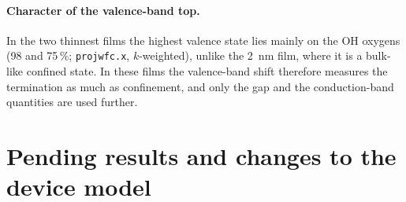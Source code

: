 \paragraph{Character of the valence-band top.} In the two thinnest films the highest valence state lies mainly on the
OH oxygens (98 and 75\,\%; \texttt{projwfc.x}, $k$-weighted), unlike the 2~nm film, where it is a bulk-like confined
state. In these films the valence-band shift therefore measures the termination as much as confinement, and only the
gap and the conduction-band quantities are used further.

\section{Pending results and changes to the device model}
\label{sec:dft-pending}

